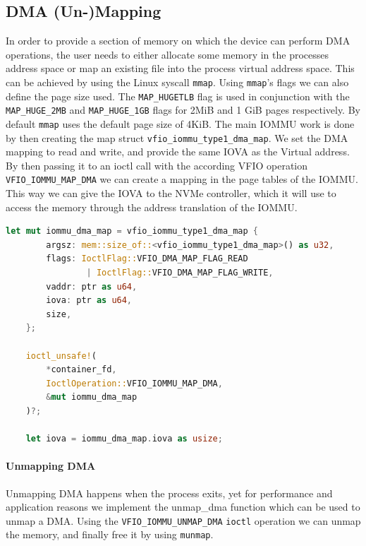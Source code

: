 \subsection{DMA (Un-)Mapping}\label{sec:dmamapping}
In order to provide a section of memory on which the device can perform DMA operations, the user needs to either allocate some memory in the processes address space or map an existing file into the process virtual address space. This can be achieved by using the Linux syscall \texttt{mmap}. Using \texttt{mmap}'s flags we can also define the page size used. The \texttt{MAP\_HUGETLB} flag is used in conjunction with the \texttt{MAP\_HUGE\_2MB} and \texttt{MAP\_HUGE\_1GB} flags for 2MiB and 1 GiB pages respectively. By default \texttt{mmap} uses the default page size of 4KiB.
The main IOMMU work is done by then creating the map struct \texttt{vfio\_iommu\_type1\_dma\_map}. We set the DMA mapping to read and write, and provide the same IOVA as the Virtual address. By then passing it to an ioctl call with the according VFIO operation \texttt{VFIO\_IOMMU\_MAP\_DMA} we can create a mapping in the page tables of the IOMMU. This way we can give the IOVA to the NVMe controller, which it will use to access the memory through the address translation of the IOMMU.

\begin{lstlisting}[language=Rust,caption={Mapping memory for DMA}, label=lst:mapdma]
    let mut iommu_dma_map = vfio_iommu_type1_dma_map {
        argsz: mem::size_of::<vfio_iommu_type1_dma_map>() as u32,
        flags: IoctlFlag::VFIO_DMA_MAP_FLAG_READ 
                | IoctlFlag::VFIO_DMA_MAP_FLAG_WRITE,
        vaddr: ptr as u64,
        iova: ptr as u64,
        size,
    };

    ioctl_unsafe!(
        *container_fd,
        IoctlOperation::VFIO_IOMMU_MAP_DMA,
        &mut iommu_dma_map
    )?;

    let iova = iommu_dma_map.iova as usize; 
\end{lstlisting}

\paragraph{Unmapping DMA}
Unmapping DMA happens when the process exits, yet for performance and application reasons we implement the unmap\_dma function which can be used to unmap a DMA. Using the \texttt{VFIO\_IOMMU\_UNMAP\_DMA} \texttt{ioctl} operation we can unmap the memory, and finally free it by using \texttt{munmap}.

